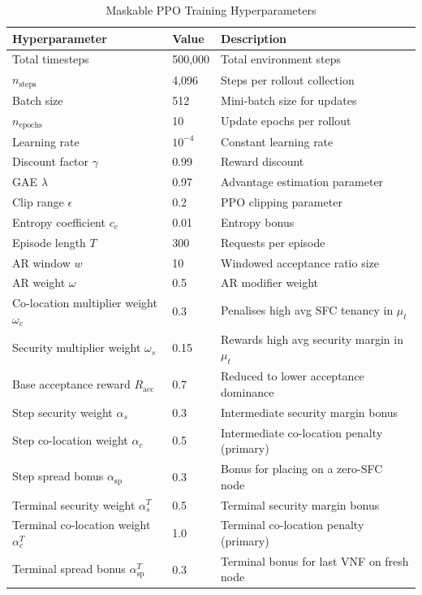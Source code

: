 \begin{table}[!ht]
\centering
\caption{Maskable PPO Training Hyperparameters}
\label{tab:training}
\begin{tabularx}{\textwidth}{X X X}
\hline
\textbf{Hyperparameter} & \textbf{Value} & \textbf{Description} \\ \hline
Total timesteps & 500,000 & Total environment steps \\
$n_{\text{steps}}$ & 4,096 & Steps per rollout collection \\
Batch size & 512 & Mini-batch size for updates \\
$n_{\text{epochs}}$ & 10 & Update epochs per rollout \\
Learning rate & $10^{-4}$ & Constant learning rate \\
Discount factor $\gamma$ & 0.99 & Reward discount \\
GAE $\lambda$ & 0.97 & Advantage estimation parameter \\
Clip range $\epsilon$ & 0.2 & PPO clipping parameter \\
Entropy coefficient $c_e$ & 0.01 & Entropy bonus \\
Episode length $T$ & 300 & Requests per episode \\
AR window $w$ & 10 & Windowed acceptance ratio size \\
AR weight $\omega$ & 0.5 & AR modifier weight \\
Co-location multiplier weight $\omega_c$ & 0.3 & Penalises high avg SFC tenancy in $\mu_t$ \\
Security multiplier weight $\omega_s$ & 0.15 & Rewards high avg security margin in $\mu_t$ \\
Base acceptance reward $R_{\text{acc}}$ & 0.7 & Reduced to lower acceptance dominance \\
Step security weight $\alpha_s$ & 0.3 & Intermediate security margin bonus \\
Step co-location weight $\alpha_c$ & 0.5 & Intermediate co-location penalty (primary) \\
Step spread bonus $\alpha_{\text{sp}}$ & 0.3 & Bonus for placing on a zero-SFC node \\
Terminal security weight $\alpha_s^T$ & 0.5 & Terminal security margin bonus \\
Terminal co-location weight $\alpha_c^T$ & 1.0 & Terminal co-location penalty (primary) \\
Terminal spread bonus $\alpha_{\text{sp}}^T$ & 0.3 & Terminal bonus for last VNF on fresh node \\
\hline
\end{tabularx}
\end{table}

